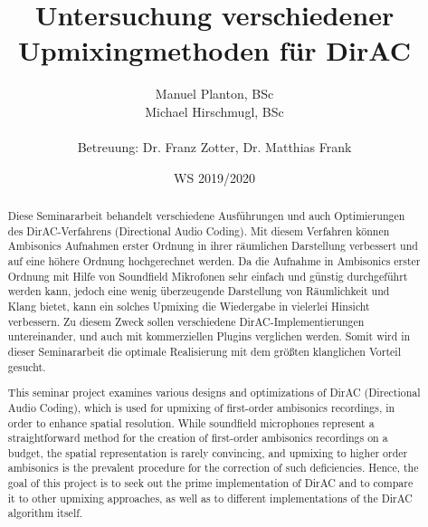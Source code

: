 \documentclass[12pt, a4paper]{article}
\begin{document}

\title{Untersuchung verschiedener Upmixingmethoden für DirAC}

\author{Manuel Planton, BSc \\ Michael Hirschmugl, BSc\\\\\small{Betreuung: Dr. Franz Zotter, Dr. Matthias Frank}}



\date{WS 2019/2020}

\maketitle
\newpage
\pagestyle{empty}
\hspace{1cm}\vspace{3cm}

\hspace{1cm}\vspace{1cm}

\begin{abstract}
   Diese Seminararbeit behandelt verschiedene Ausführungen und auch Optimierungen des DirAC-Verfahrens (Directional Audio Coding). Mit diesem Verfahren können Ambisonics Aufnahmen erster Ordnung in ihrer räumlichen Darstellung verbessert und auf eine höhere Ordnung hochgerechnet werden.
   Da die Aufnahme in Ambisonics erster Ordnung mit Hilfe von Soundfield Mikrofonen sehr einfach und günstig durchgeführt werden kann, jedoch eine wenig überzeugende Darstellung von Räumlichkeit und Klang bietet, kann ein solches Upmixing die Wiedergabe in vielerlei Hinsicht verbessern.
   Zu diesem Zweck sollen verschiedene DirAC-Implementierungen untereinander, und auch mit kommerziellen Plugins verglichen werden. Somit wird in dieser Seminararbeit die optimale Realisierung mit dem größten klanglichen Vorteil gesucht.
\end{abstract}
\begin{abstract}
   This seminar project examines various designs and optimizations of DirAC (Directional Audio Coding), which is used for upmixing of first-order ambisonics recordings, in order to enhance spatial resolution.
   While soundfield microphones represent a straightforward method for the creation of first-order ambisonics recordings on a budget, the spatial representation is rarely convincing, and upmixing to higher order ambisonics is the prevalent procedure for the correction of such deficiencies.
   Hence, the goal of this project is to seek out the prime implementation of DirAC and to compare it to other upmixing approaches, as well as to different implementations of the DirAC algorithm itself.
\end{abstract}
\newpage
\pagestyle{myheadings}
\hspace{1cm}\vspace{2cm}
\end{document}
